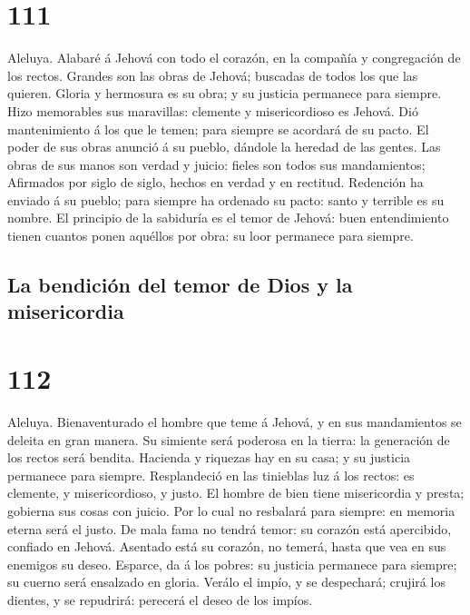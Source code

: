 \hypertarget{section-110}{%
\section{111}\label{section-110}}

 Aleluya. Alabaré á Jehová con todo el corazón, en la
compañía y congregación de los rectos.  Grandes son las
obras de Jehová; buscadas de todos los que las quieren. 
Gloria y hermosura es su obra; y su justicia permanece para siempre.
 Hizo memorables sus maravillas: clemente y misericordioso
es Jehová.  Dió mantenimiento á los que le temen; para
siempre se acordará de su pacto.  El poder de sus obras
anunció á su pueblo, dándole la heredad de las gentes. 
Las obras de sus manos son verdad y juicio: fieles son todos sus
mandamientos;  Afirmados por siglo de siglo, hechos en
verdad y en rectitud.  Redención ha enviado á su pueblo;
para siempre ha ordenado su pacto: santo y terrible es su nombre.
 El principio de la sabiduría es el temor de Jehová: buen
entendimiento tienen cuantos ponen aquéllos por obra: su loor permanece
para siempre.

\hypertarget{la-bendiciuxf3n-del-temor-de-dios-y-la-misericordia}{%
\subsection{La bendición del temor de Dios y la
misericordia}\label{la-bendiciuxf3n-del-temor-de-dios-y-la-misericordia}}

\hypertarget{section-111}{%
\section{112}\label{section-111}}

 Aleluya. Bienaventurado el hombre que teme á Jehová, y en
sus mandamientos se deleita en gran manera.  Su simiente
será poderosa en la tierra: la generación de los rectos será bendita.
 Hacienda y riquezas hay en su casa; y su justicia
permanece para siempre.  Resplandeció en las tinieblas luz
á los rectos: es clemente, y misericordioso, y justo.  El
hombre de bien tiene misericordia y presta; gobierna sus cosas con
juicio.  Por lo cual no resbalará para siempre: en memoria
eterna será el justo.  De mala fama no tendrá temor: su
corazón está apercibido, confiado en Jehová.  Asentado
está su corazón, no temerá, hasta que vea en sus enemigos su deseo.
 Esparce, da á los pobres: su justicia permanece para
siempre; su cuerno será ensalzado en gloria.  Verálo el
impío, y se despechará; crujirá los dientes, y se repudrirá: perecerá el
deseo de los impíos.

